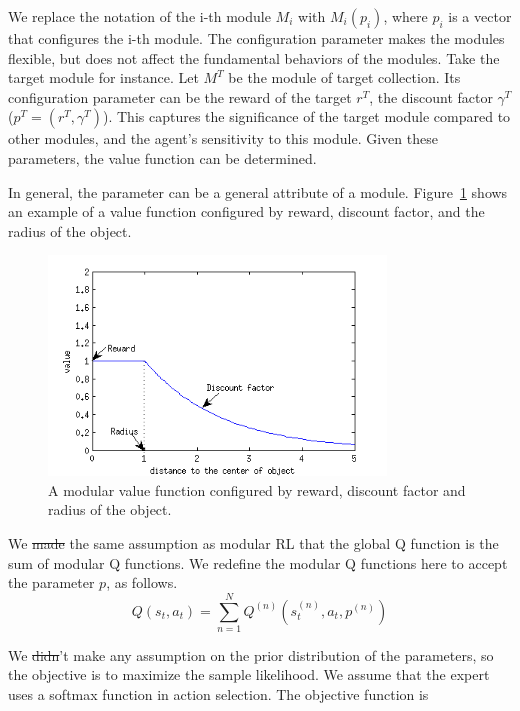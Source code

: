 \documentclass[12pt]{report}	%
\theoremstyle{definition}
\theoremstyle{remark}
\providecommand{\DIFadd}[1]{{\protect\color{blue}\uwave{#1}}} %
\providecommand{\DIFdel}[1]{{\protect\color{red}\sout{#1}}}                      %
\providecommand{\DIFaddbegin}{} %
\providecommand{\DIFaddend}{} %
\providecommand{\DIFdelbegin}{} %
\providecommand{\DIFdelend}{} %
\begin{document}
We replace the notation of the i-th module $M_i$ with $M_i(p_i)$, where $p_i$ is
a vector that configures the i-th module. The configuration parameter makes the
modules flexible, but does not affect the fundamental behaviors of the modules.
Take the target module for instance. Let $M^T$ be the module of target
collection. Its configuration parameter can be the reward of the target $r^T$, the
discount factor $\gamma^T$ ($p^T = (r^T, \gamma^T)$). This captures the
significance of the target module compared to other modules, and the agent's
sensitivity to this module. Given these parameters, the value function can be
determined.

In general, the parameter can be a general attribute of a module.
Figure~\ref{fig:modularQ} shows an example of a value function configured by
reward, discount factor, and the radius of the object.

\begin{figure}[h]
\centering
\includegraphics[width=0.8\textwidth]{figs/modularQ}
\caption{A modular value function configured by reward, discount factor and
radius of the object.}
\label{fig:modularQ}
\end{figure}

We \DIFdelbegin \DIFdel{made }\DIFdelend \DIFaddbegin \DIFadd{make }\DIFaddend the same assumption as modular RL \DIFaddbegin \DIFadd{in }\DIFaddend that the global Q function is the sum
of modular Q functions. We redefine the modular Q functions here to accept the 
parameter $p$, as follows.
\begin{equation}
Q(s_t,a_t) = \sum_{n=1}^{N} Q^{(n)}(s_t^{(n)},a_t,p^{(n)})
\end{equation}

We \DIFdelbegin \DIFdel{didn}\DIFdelend \DIFaddbegin \DIFadd{don}\DIFaddend 't make any assumption on the prior distribution of the parameters, so
the objective is to maximize the sample likelihood. We assume that the expert
uses a softmax function in action selection. The objective function is
\end{document}

